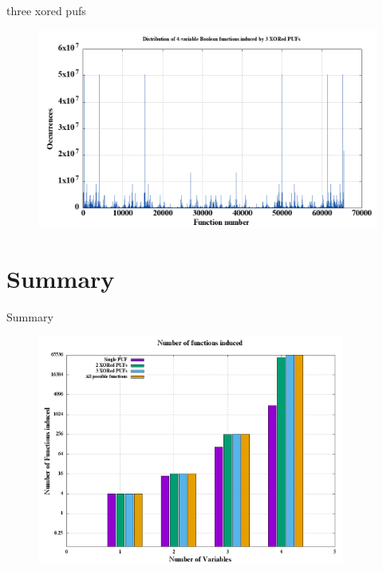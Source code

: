 \documentclass[10pt, compress]{beamer}
\begin{document}
\begin{frame}{three xored pufs}
    \begin{figure}
        \centering
        \includegraphics[width=\textwidth]{figures/dist/distribution_of_4-variable_boolean_functions_induced_by_3_xored_pufs.png}
    \end{figure}
\end{frame}

\section{Summary}

\begin{frame}{Summary}
    \begin{figure}
        \centering
        \includegraphics[width=0.9\textwidth]{figures/hist.png}
    \end{figure}
\end{frame}
\end{document}
